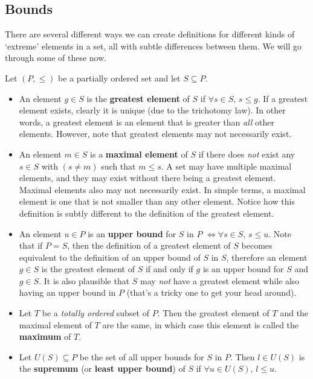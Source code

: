 \documentclass[../real_analysis.tex]{subfiles}
\begin{document}
        \subsection{Bounds}\label{subsec:bounds}
            There are several different ways we can create definitions for different kinds of `extreme' elements in a set, all with subtle differences between them. We will go through some of these now.
            \begin{definition}
                Let $(P, \leq)$ be a partially ordered set and let $S \subseteq P$.
                \begin{itemize}
                    \item An element $g \in S$ is the \textbf{greatest element} of $S$ if $\forall s \in S,\, s \leq g$. If a greatest element exists, clearly it is unique (due to the trichotomy law).
                    In other words, a greatest element is an element that is greater than \textit{all} other elements. However, note that greatest elements may not necessarily exist.
                    \item An element $m \in S$ is a \textbf{maximal element} of $S$ if there does \textit{not} exist any $s \in S$ with $(s \neq m)$ such that $m \leq s$. A set may have multiple maximal elements, and they may exist without there being a greatest element. Maximal elements also may not necessarily exist.
                    In simple terms, a maximal element is one that is not smaller than any other element. Notice how this definition is subtly different to the definition of the greatest element.
                    \item An element $u \in P$ is an \textbf{upper bound} for $S$ in $P$ $\iff \forall s \in S,\, s \leq u$.
                    Note that if $P=S$, then the definition of a greatest element of $S$ becomes equivalent to the definition of an upper bound of $S$ in $S$, therefore an element $g \in S$ is the greatest element of $S$ if and only if $g$ is an upper bound for $S$ and $g \in S$. It is also plausible that $S$ may \textit{not} have a greatest element while also having an upper bound in $P$ (that's a tricky one to get your head around).
                    \item Let $T$ be a \textit{totally ordered} subset of $P$. Then the greatest element of $T$ and the maximal element of $T$ are the same, in which case this element is called the \textbf{maximum} of $T$.
                    \item Let $U(S) \subseteq P$ be the set of all upper bounds for $S$ in $P$. Then $l \in U(S)$ is the \textbf{supremum} (or \textbf{least upper bound}) of $S$ if $\forall u \in U(S),\, l \leq u$.

\end{itemize}
\end{definition}
\end{document}

